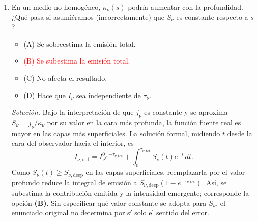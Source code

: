 \documentclass[11pt]{article}
\begin{document}
\begin{enumerate}
    \item En un medio no homogéneo, $\kappa_\nu(s)$ podría aumentar con la profundidad. ¿Qué pasa si asumiéramos (incorrectamente) que $S_\nu$ es constante respecto a $s$?
    \begin{itemize}
        \item (A) Se sobreestima la emisión total.
        \item \textcolor{red}{(B) Se subestima la emisión total.}
        \item (C) No afecta el resultado.
        \item (D) Hace que $I_\nu$ sea independiente de $\tau_\nu$.
    \end{itemize}
    \textit{Solución.} Bajo la interpretación de que $j_\nu$ es constante y se aproxima $S_\nu=j_\nu/\kappa_\nu$ por su valor en la cara más profunda, la función fuente real es mayor en las capas más superficiales. La solución formal, midiendo $t$ desde la cara del observador hacia el interior, es
    \[
        I_{\nu,\mathrm{out}}=I^0_\nu e^{-\tau_{\nu,\mathrm{tot}}}
        +\int_0^{\tau_{\nu,\mathrm{tot}}}S_\nu(t)e^{-t}\,dt.
    \]
    Como $S_\nu(t)\geq S_{\nu,\mathrm{deep}}$ en las capas superficiales, reemplazarla por el valor profundo reduce la integral de emisión a $S_{\nu,\mathrm{deep}}(1-e^{-\tau_{\nu,\mathrm{tot}}})$. Así, se subestima la contribución emitida y la intensidad emergente; corresponde la opción \textbf{(B)}. Sin especificar qué valor constante se adopta para $S_\nu$, el enunciado original no determina por sí solo el sentido del error. \parencite[Sec. 13.7, pp. 403--405]{chaparro2026}


\end{enumerate}
\end{document}
